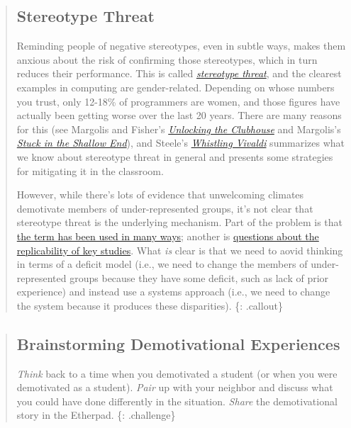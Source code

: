\begin{quote}
\subsection{Stereotype Threat}\label{stereotype-threat}

Reminding people of negative stereotypes, even in subtle ways, makes
them anxious about the risk of confirming those stereotypes, which in
turn reduces their performance. This is called
\emph{\href{https://en.wikipedia.org/wiki/Stereotype_threat}{stereotype
threat}}, and the clearest examples in computing are gender-related.
Depending on whose numbers you trust, only 12-18\% of programmers are
women, and those figures have actually been getting worse over the last
20 years. There are many reasons for this (see Margolis and Fisher's
\emph{\href{http://www.amazon.com/Unlocking-Clubhouse-Computing-Jane-Margolis/dp/0262632691/}{Unlocking
the Clubhouse}} and Margolis's
\emph{\href{https://www.amazon.com/Stuck-Shallow-End-Education-Computing/dp/0262514044/}{Stuck
in the Shallow End}}), and Steele's
\emph{\href{http://www.amazon.com/dp/0393339726/}{Whistling Vivaldi}}
summarizes what we know about stereotype threat in general and presents
some strategies for mitigating it in the classroom.

However, while there's lots of evidence that unwelcoming climates
demotivate members of under-represented groups, it's not clear that
stereotype threat is the underlying mechanism. Part of the problem is
that
\href{http://www.europhd.net/html/_onda02/07/PDF/20th_lab_materials/jane/shapiro_neuberg_2007.pdf}{the
term has been used in many ways}; another is
\href{https://www.psychologytoday.com/blog/rabble-rouser/201512/is-stereotype-threat-overcooked-overstated-and-oversold}{questions
about the replicability of key studies}. What \emph{is} clear is that we
need to aovid thinking in terms of a deficit model (i.e., we need to
change the members of under-represented groups because they have some
deficit, such as lack of prior experience) and instead use a systems
approach (i.e., we need to change the system because it produces these
disparities). \{: .callout\}
\end{quote}

\begin{quote}
\subsection{Brainstorming Demotivational
Experiences}\label{brainstorming-demotivational-experiences}

\emph{Think} back to a time when you demotivated a student (or when you
were demotivated as a student). \emph{Pair} up with your neighbor and
discuss what you could have done differently in the situation.
\emph{Share} the demotivational story in the Etherpad. \{: .challenge\}
\end{quote}

